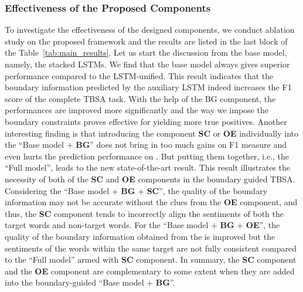 \documentclass[letterpaper]{article} \usepackage{aaai19}  \usepackage{times}  \usepackage{helvet}  \usepackage{courier}  \usepackage{url}  \usepackage{graphicx}  \frenchspacing  \setlength{\pdfpagewidth}{8.5in}  \setlength{\pdfpageheight}{11in}
\begin{document}
\subsubsection{Effectiveness of the Proposed Components}
To investigate the effectiveness of the designed components, we conduct ablation study on the proposed framework and the results are listed in the last block of the Table~\ref{tab:main_results}. 
Let us start the discussion from the base model, namely, the stacked LSTMs. We find that the base model always gives superior performance compared to the LSTM-unified. 
This result indicates that the boundary information predicted by the auxiliary LSTM indeed increases the F1 score of the complete TBSA task. 
With the help of the BG component, the performances are improved more significantly and the way we impose the boundary constraints proves effective for yielding more true positives. 
Another interesting finding is that introducing the component \textbf{SC} or \textbf{OE} individually into the ``Base model + \textbf{BG}'' does not bring in too much gains on F1 measure and even hurts the prediction performance on . But putting them together, i.e.,  the ``Full model'', leads to the new state-of-the-art result. 
This result illustrates the necessity of both of the \textbf{SC} and \textbf{OE} components in the boundary guided TBSA. Considering the ``Base model + \textbf{BG} + \textbf{SC}'', the quality of the boundary information may not be accurate without the clues from the \textbf{OE} component, and thus, the \textbf{SC} component tends to incorrectly align the sentiments of both the target words and non-target words. 
For the ``Base model + \textbf{BG} + \textbf{OE}'', the quality of the boundary information obtained from the  is improved but the sentiments of the words within the same target are not fully consistent compared to the ``Full model'' armed with \textbf{SC} component. 
In summary, the \textbf{SC} component and the \textbf{OE} component are complementary to some extent when they are added into the boundary-guided ``Base model + \textbf{BG}''.
\end{document}
